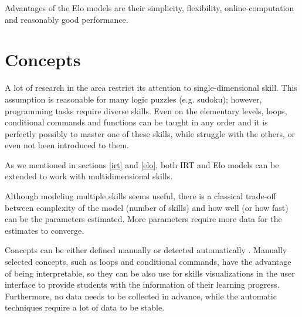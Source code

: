 Advantages of the Elo models are their simplicity, flexibility,
online-computation and reasonably good performance.


\section{Concepts}


A lot of research in the area restrict its attention to single-dimensional skill.
This assumption is reasonable for many logic puzzles (e.g. sudoku);
however, programming tasks require diverse skills.
Even on the elementary levels, loops, conditional commands and functions
  can be taught in any order
  and it is perfectly possibly to master one of these skills,
  while struggle with the others, or even not been introduced to them.

As we mentioned in sections \ref{irt} and \ref{elo},
  both IRT and Elo models can be extended to work with multidimensional skills.

Although modeling multiple skills seems useful,
  there is a classical trade-off between complexity of the model (number of skills)
  and how well (or how fast) can be the parameters estimated.
More parameters require more data for the estimates to converge.



Concepts can be either defined manually or detected automatically
  \cite{niznan-thesis}.  %
Manually selected concepts, such as loops and conditional commands,
  have the advantage of being interpretable,
  so they can be also use for skills visualizations in the user interface
  to provide students with the information of their learning progress.
Furthermore, no data needs to be collected in advance,
  while the automatic techniques require a lot of data to be stable.  %


